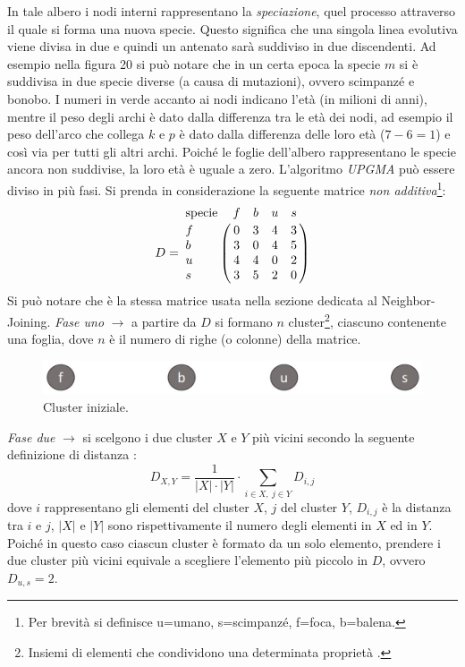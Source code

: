 \newline
In tale albero i nodi interni rappresentano la \textit{speciazione}, quel processo attraverso il quale si forma una nuova specie. Questo significa che una singola linea evolutiva viene divisa in due \cite{speciationBritannica} e quindi un antenato sarà suddiviso in due discendenti. Ad esempio nella figura 20 si può notare che in un certa epoca la specie $m$ si è suddivisa in due specie diverse (a causa di mutazioni), ovvero scimpanzé e bonobo. I numeri in verde accanto ai nodi indicano l'età (in milioni di anni), mentre il peso degli archi è dato dalla differenza tra le età dei nodi, ad esempio il peso dell'arco che collega $k$ e $p$ è dato dalla differenza delle loro età ($7-6=1$) e così via per tutti gli altri archi. Poiché le foglie dell'albero rappresentano le specie ancora non suddivise, la loro età è uguale a zero.
\newline
L'algoritmo \textit{UPGMA} può essere diviso in più fasi. Si prenda in considerazione la seguente matrice \textit{non additiva}\footnote{Per brevità si definisce u=umano, s=scimpanzé, f=foca, b=balena.}:
\[
D = \bordermatrix{\text{specie}&f&b&u&s\cr
                f& 0 & 3 & 4 & 3\cr
                b& 3 & 0 & 4 & 5\cr
                u& 4 & 4 & 0 & 2\cr
                s& 3 & 5 & 2 & 0}
\]
Si può notare che è la stessa matrice usata nella sezione dedicata al Neighbor-Joining.
\newline
\textit{Fase uno} $\rightarrow$ a partire da $D$ si formano $n$ cluster\footnote{Insiemi di elementi che condividono una determinata proprietà \cite{cambdrigeClusterDef}.}, ciascuno contenente una foglia, dove $n$ è il numero di righe (o colonne) della matrice.
\begin{figure}[h!]
\centering
	\includegraphics[height=1cm, width=12cm, keepaspectratio]{rooted_upgma_2.jpg}
 	\caption{Cluster iniziale.}
  	\label{fig:rooted_upgma_2}
\end{figure}
\newline
\textit{Fase due} $\rightarrow$ si scelgono i due cluster $X$ e $Y$ più vicini secondo la seguente definizione di distanza \cite{understandingBioinf}:
\[
D_{X,Y}=\frac{1}{\left | X \right |\cdot \left | Y \right |} \cdot \sum_{i\in X,\: j\in Y}D_{i,j}
\]
dove $i$ rappresentano gli elementi del cluster $X$, $j$ del cluster $Y$, $D_{i,j}$ è la distanza tra $i$ e $j$, $ \left | X \right | $ e $ \left | Y \right | $ sono rispettivamente il numero degli elementi in $X$ ed in $Y$. Poiché in questo caso  ciascun cluster è formato da un solo elemento, prendere i due cluster più vicini equivale a scegliere l'elemento più piccolo in $D$, ovvero $D_{u,s}=2$.
